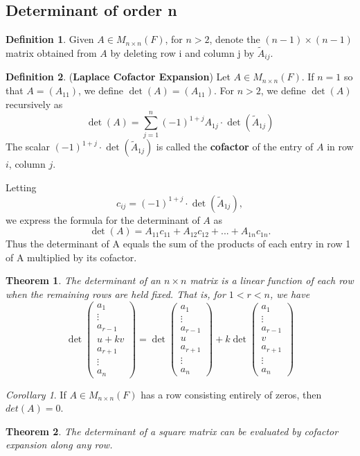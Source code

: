 \documentclass[12pt]{article}
\newtheorem{theorem}{Theorem}[section]
\theoremstyle{definition}
\newtheorem{definition}{Definition}[section]
\theoremstyle{remark}
\newtheorem{corollary}{Corollary}[theorem]
\begin{document}
\subsection{Determinant of order n}
\begin{definition}
    Given $A \in M_{n\times n} (F)$, for $n > 2$, denote the $(n - 1) \times (n - 1)$ matrix obtained from $A $ 
    by deleting row i and column j by $\tilde{A}_{ij}$.
\end{definition}
\begin{definition}(\textbf{Laplace Cofactor Expansion})
    Let $A \in M_{n\times n}(F)$. If $n = 1$ so that $A = (A_{11})$, we define $\det(A) = (A_{11})$. For $n > 2$, 
    we define $\det(A)$ recursively as
    $$\det(A) =\sum^n_{j = 1} (-1)^{1+j} A_{1j} \cdot \det(\tilde{A}_{1j})$$
    The scalar $(-1)^{1+j} \cdot \det(\tilde{A}_{1j})$ is called the \textbf{cofactor} of the entry of 
    $A$ in row $i$, column $j$. 

    Letting 
    $$c_{ij} = (-1)^{1+j}  \cdot \det(\tilde{A}_{1j}),$$ 
    we express the formula for the determinant of $A$ as 
    $$\det(A) = A_{11} c_{11} + A_{12}c_{12} + ... + A_{1n} c_{1n}.$$
    Thus the determinant of A equals the sum of the products of each entry in row 1 of A multiplied by its cofactor.
\end{definition}
\begin{theorem}
    The determinant of an $n \times n$ matrix is a linear function of each row when the remaining rows are held fixed. 
    That is, for $1 < r < n$, we have
    $$\det \begin{pmatrix}
        a_1 \\ \vdots \\ a_{r-1} \\ u+kv \\ a_{r+1} \\ \vdots \\ a_n 
    \end{pmatrix} = 
    \det \begin{pmatrix}
        a_1 \\ \vdots \\ a_{r-1} \\ u \\ a_{r+1} \\ \vdots \\ a_n 
    \end{pmatrix} 
    + k \det  \begin{pmatrix}a_1 \\ \vdots \\ a_{r-1} \\ v \\ a_{r+1} \\ \vdots \\ a_n 
    \end{pmatrix}$$
\end{theorem}
\begin{corollary}
    If $A \in M_{n \times n} (F)$ has a row consisting entirely of zeros, then $det(A) = 0$.
\end{corollary}
\begin{theorem}
    The determinant of a square matrix can be evaluated by cofactor expansion along any row.
\end{theorem}
\end{document}

